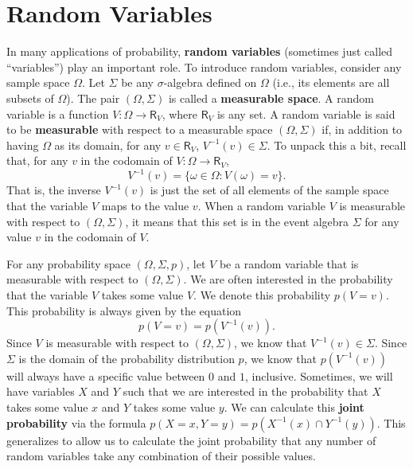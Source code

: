 \documentclass[11pt]{article}
\theoremstyle{definition}
\theoremstyle{remark}
\begin{document}
\section{Random Variables}
In many applications of probability, \textbf{random variables} (sometimes just called ``variables'') play an important role. To introduce random variables, consider any sample space $\Omega$. Let $\Sigma$ be any $\sigma$-algebra defined on $\Omega$ (i.e., its elements are all subsets of $\Omega$). The pair $(\Omega,\Sigma)$ is called a \textbf{measurable space}. A random variable is a function $V:\Omega\rightarrow\textsf{R}_{V}$, where $\textsf{R}_{V}$ is any set. A random variable is said to be \textbf{measurable} with respect to a measurable space $(\Omega,\Sigma)$ if, in addition to having $\Omega$ as its domain, for any $v\in\textsf{R}_{V}$, $V^{-1}(v)\in\Sigma$. To unpack this a bit, recall that, for any $v$ in the codomain of $V:\Omega\rightarrow\textsf{R}_{V}$, 
$$V^{-1}(v)=\{\omega\in\Omega:V(\omega)=v\}.$$
That is, the inverse $V^{-1}(v)$ is just the set of all elements of the sample space that the variable $V$ maps to the value $v$. When a random variable $V$ is measurable with respect to $(\Omega,\Sigma)$, it means that this set is in the event algebra $\Sigma$ for any value $v$ in the codomain of $V$.\par 


For any probability space $(\Omega,\Sigma,p)$, let $V$ be a random variable that is measurable with respect to $(\Omega,\Sigma)$. We are often interested in the probability that the variable $V$ takes some value $V$. We denote this probability $p(V=v)$. This probability is always given by the equation $$p(V=v)=p(V^{-1}(v)).$$ Since $V$ is measurable with respect to $(\Omega,\Sigma)$, we know that $V^{-1}(v)\in\Sigma$. Since $\Sigma$ is the domain of the probability distribution $p$, we know that $p(V^{-1}(v))$ will always have a specific value between $0$ and $1$, inclusive. Sometimes, we will have variables $X$ and $Y$ such that we are interested in the probability that $X$ takes some value $x$ and $Y$ takes some value $y$. We can calculate this \textbf{joint probability} via the formula $p(X=x,Y=y)=p(X^{-1}(x)\cap Y^{-1}(y))$. This generalizes to allow us to calculate the joint probability that any number of random variables take any combination of their possible values.\par
\end{document}
